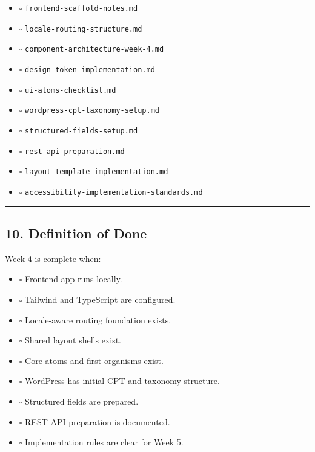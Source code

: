 \documentclass[12pt,a4paper]{article}
\providecommand{\tightlist}{\setlength{\itemsep}{0pt}\setlength{\parskip}{0pt}}
\begin{document}
\begin{itemize}
\tightlist
\item
  \(\square\) \texttt{frontend-scaffold-notes.md}
\item
  \(\square\) \texttt{locale-routing-structure.md}
\item
  \(\square\) \texttt{component-architecture-week-4.md}
\item
  \(\square\) \texttt{design-token-implementation.md}
\item
  \(\square\) \texttt{ui-atoms-checklist.md}
\item
  \(\square\) \texttt{wordpress-cpt-taxonomy-setup.md}
\item
  \(\square\) \texttt{structured-fields-setup.md}
\item
  \(\square\) \texttt{rest-api-preparation.md}
\item
  \(\square\) \texttt{layout-template-implementation.md}
\item
  \(\square\) \texttt{accessibility-implementation-standards.md}
\end{itemize}

\begin{center}\rule{0.5\linewidth}{0.5pt}\end{center}

\subsection{10. Definition of Done}\label{definition-of-done}

Week 4 is complete when:

\begin{itemize}
\tightlist
\item
  \(\square\) Frontend app runs locally.
\item
  \(\square\) Tailwind and TypeScript are configured.
\item
  \(\square\) Locale-aware routing foundation exists.
\item
  \(\square\) Shared layout shells exist.
\item
  \(\square\) Core atoms and first organisms exist.
\item
  \(\square\) WordPress has initial CPT and taxonomy structure.
\item
  \(\square\) Structured fields are prepared.
\item
  \(\square\) REST API preparation is documented.
\item
  \(\square\) Implementation rules are clear for Week 5.
\end{itemize}
\end{document}
